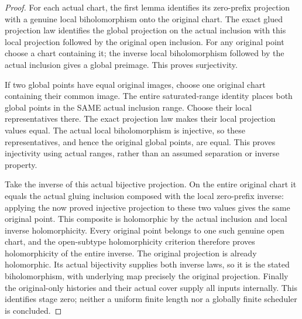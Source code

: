 \begin{proof}
For each actual chart, the first lemma identifies its zero-prefix
projection with a genuine local biholomorphism onto the original chart.
The exact glued projection law identifies the global projection on the
actual inclusion with this local projection followed by the original
open inclusion. For any original point choose a chart containing it;
the inverse local biholomorphism followed by the actual inclusion gives
a global preimage. This proves surjectivity.

If two global points have equal original images, choose one original
chart containing their common image. The entire saturated-range identity
places both global points in the SAME actual inclusion range. Choose
their local representatives there. The exact projection law makes their
local projection values equal. The actual local biholomorphism is
injective, so these representatives, and hence the original global points,
are equal. This proves injectivity using actual ranges, rather than an
assumed separation or inverse property.

Take the inverse of this actual bijective projection. On the entire
original chart it equals the actual gluing inclusion composed with the
local zero-prefix inverse: applying the now proved injective projection
to these two values gives the same original point. This composite is
holomorphic by the actual inclusion and local inverse holomorphicity.
Every original point belongs to one such genuine open chart, and the
open-subtype holomorphicity criterion therefore proves holomorphicity
of the entire inverse. The original projection is already holomorphic.
Its actual bijectivity supplies both inverse laws, so it is the stated
biholomorphism, with underlying map precisely the original projection.
Finally the original-only histories and their actual cover supply all
inputs internally. This identifies stage zero; neither a uniform finite
length nor a globally finite scheduler is concluded.
\end{proof}
